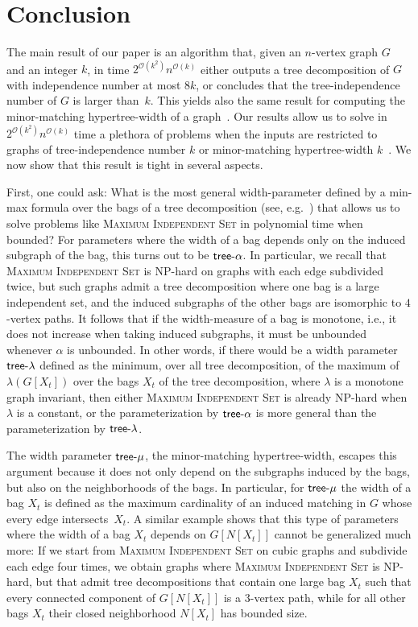 \documentclass[11pt]{article}
\theoremstyle{definition}
\newcommand{\tin}{\mathsf{tree} \textnormal{-} \alpha}
\newcommand{\trlambda}{\mathsf{tree} \textnormal{-} \lambda}
\newcommand{\trmu}{\mathsf{tree} \textnormal{-} \mu}
\newcommand{\NP}{\textup{\textsf{NP}}}
\newcommand{\OO}{\mathcal{O}}
\begin{document}
\section{Conclusion}\label{sec:concl}

The main result of our paper is an algorithm that, given an $n$-vertex graph $G$ and an integer $k$, in time $2^{\OO(k^2)} n^{\OO(k)}$ either outputs a tree decomposition of $G$ with independence number at most $8k$, or concludes that the tree-independence number of $G$ is larger than~$k$.
This yields also the same result for computing the minor-matching hypertree-width of a graph~\cite{Yolov18}.
Our results allow us to solve in $2^{\OO(k^2)} n^{\OO(k)}$ time a plethora of problems when the inputs are restricted to graphs of tree-independence number $k$ or minor-matching hypertree-width $k$~\cite{DallardMS24,LMMORS24,Yolov18}.
We now show that this result is tight in several aspects.


First, one could ask: What is the most general width-parameter defined by a min-max formula over the bags of a tree decomposition (see, e.g.~\cite{adler2006width,MR3144912}) that allows us to solve problems like \textsc{Maximum Independent Set} in polynomial time when bounded?
For parameters where the width of a bag depends only on the induced subgraph of the bag, this turns out to be $\tin$.
In particular, we recall that \textsc{Maximum Independent Set} is \NP-hard on graphs with each edge subdivided twice, but such graphs admit a tree decomposition where one bag is a large independent set, and the induced subgraphs of the other bags are isomorphic to $4$-vertex paths.
It follows that if the width-measure of a bag is monotone, i.e., it does not increase when taking induced subgraphs, it must be unbounded whenever $\alpha$ is unbounded.
In other words, if there would be a width parameter $\trlambda$ defined as the minimum, over all tree decomposition, of the maximum of $\lambda(G[X_t])$ over the bags $X_t$ of the tree decomposition, where $\lambda$ is a monotone graph invariant, then either \textsc{Maximum Independent Set} is already \NP-hard when $\lambda$ is a constant, or the parameterization by $\tin$ is more general than the parameterization by $\trlambda$.

The width parameter $\trmu$, the
minor-matching hypertree-width, escapes this argument because it does not only depend on the subgraphs induced by the bags, but also on the neighborhoods of the bags.
In particular, for $\trmu$ the width of a bag $X_t$ is defined as the maximum cardinality of an induced matching in $G$ whose every edge intersects~$X_t$.
A similar example shows that this type of parameters where the width of a bag $X_t$ depends on $G[N[X_t]]$ cannot be generalized much more:
If we start from \textsc{Maximum Independent Set} on cubic graphs and subdivide each edge four times, we obtain graphs where \textsc{Maximum Independent Set} is \NP-hard, but that admit tree decompositions that contain one large bag $X_t$ such that every connected component of $G[N[X_t]]$ is a $3$-vertex path, while for all other bags $X_t$ their closed neighborhood $N[X_t]$ has bounded size.
\end{document}

